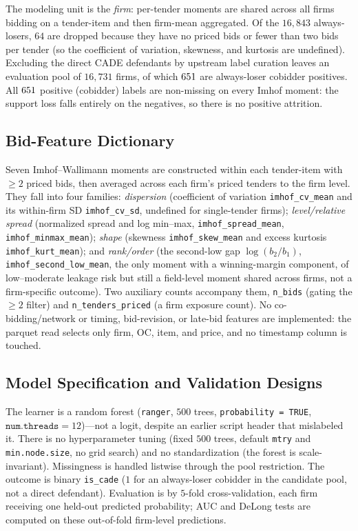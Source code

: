 The modeling unit is the \emph{firm}: per-tender moments are shared across
all firms bidding on a tender-item and then firm-mean aggregated. Of the
$16{,}843$ always-losers, $64$ are dropped because they have no priced
bids or fewer than two bids per tender (so the coefficient of variation,
skewness, and kurtosis are undefined). Excluding the direct CADE
defendants by upstream label curation leaves an evaluation pool of
$16{,}731$ firms, of which $651$ are always-loser cobidder
positives. All $651$ positive (cobidder) labels are
non-missing on every Imhof moment: the support loss falls entirely on the
negatives, so there is no positive attrition.

\subsection{Bid-Feature Dictionary}
\label{supp:bid_dictionary}

Seven Imhof--Wallimann moments are constructed within each tender-item
with $\geq 2$ priced bids, then averaged across each firm's priced tenders
to the firm level. They fall into four families: \emph{dispersion}
(coefficient of variation \texttt{imhof\_cv\_mean} and its within-firm SD
\texttt{imhof\_cv\_sd}, undefined for single-tender firms);
\emph{level/relative spread} (normalized spread and log min--max,
\texttt{imhof\_spread\_mean}, \texttt{imhof\_minmax\_mean});
\emph{shape} (skewness \texttt{imhof\_skew\_mean} and excess kurtosis
\texttt{imhof\_kurt\_mean}); and \emph{rank/order} (the second-low gap
$\log(b_2/b_1)$, \texttt{imhof\_second\_low\_mean}, the only moment with a
winning-margin component, of low--moderate leakage risk but still a
field-level moment shared across firms, not a firm-specific outcome).
Two auxiliary counts accompany them, \texttt{n\_bids} (gating the $\geq 2$
filter) and \texttt{n\_tenders\_priced} (a firm exposure count). No
co-bidding/network or timing, bid-revision, or late-bid features are
implemented: the parquet read selects only firm, OC, item, and price, and
no timestamp column is touched.

\subsection{Model Specification and Validation Designs}
\label{supp:bid_model}

The learner is a random forest (\texttt{ranger}, $500$ trees,
\texttt{probability = TRUE}, $\texttt{num.threads}=12$)---not a logit,
despite an earlier script header that mislabeled it. There is no
hyperparameter tuning (fixed $500$ trees, default \texttt{mtry} and
\texttt{min.node.size}, no grid search) and no standardization (the forest
is scale-invariant). Missingness is handled listwise through the pool
restriction. The outcome is binary \texttt{is\_cade} ($1$ for an
always-loser cobidder in the candidate pool, not a direct defendant).
Evaluation is by $5$-fold cross-validation, each firm receiving one
held-out predicted probability; AUC and DeLong tests are computed on these
out-of-fold firm-level predictions.

